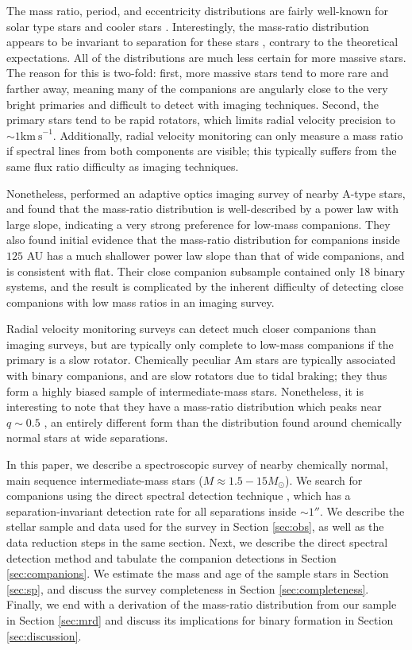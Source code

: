 \documentclass{emulateapj}
\begin{document}
The mass ratio, period, and eccentricity distributions are fairly well-known for solar type stars \citep{Duquennoy1991, Raghavan2010} and cooler stars \citep{Fischer1992, Delfosse2004}. Interestingly, the mass-ratio distribution appears to be invariant to separation for these stars \citep{Meyer2013}, contrary to the theoretical expectations. All of the distributions are much less certain for more massive stars. The reason for this is two-fold: first, more massive stars tend to more rare and farther away, meaning many of the companions are angularly close to the very bright primaries and difficult to detect with imaging techniques. Second, the primary stars tend to be rapid rotators, which limits radial velocity precision to $\sim 1 \mathrm{km\ s}^{-1}$. Additionally, radial velocity monitoring can only measure a mass ratio if spectral lines from both components are visible; this typically suffers from the same flux ratio difficulty as imaging techniques. 

Nonetheless, \citet{DeRosa2014} performed an adaptive optics imaging survey of nearby A-type stars, and found that the mass-ratio distribution is well-described by a power law with large slope, indicating a very strong preference for low-mass companions. They also found initial evidence that the mass-ratio distribution for companions inside $125$ AU has a much shallower power law slope than that of wide companions, and is consistent with flat. Their close companion subsample contained only 18 binary systems, and the result is complicated by the inherent difficulty of detecting close companions with low mass ratios in an imaging survey. 

Radial velocity monitoring surveys can detect much closer companions than imaging surveys, but are typically only complete to low-mass companions if the primary is a slow rotator. Chemically peculiar Am stars are typically associated with binary companions, and are slow rotators due to tidal braking; they thus form a highly biased sample of intermediate-mass stars. Nonetheless, it is interesting to note that they have a mass-ratio distribution which peaks near $q \sim 0.5$ \citep{Vuissoz2004}, an entirely different form than the distribution found around chemically normal stars at wide separations.

In this paper, we describe a spectroscopic survey of nearby chemically normal, main sequence intermediate-mass stars ($M \approx 1.5 - 15 M_{\odot}$). We search for companions using the direct spectral detection technique \citep{Gullikson2016}, which has a separation-invariant detection rate for all separations inside $\sim 1 ''$. We describe the stellar sample and data used for the survey in Section \ref{sec:obs}, as well as the data reduction steps in the same section. Next, we describe the direct spectral detection method and tabulate the companion detections in Section \ref{sec:companions}. We estimate the mass and age of the sample stars in Section \ref{sec:sp}, and discuss the survey completeness in Section \ref{sec:completeness}. Finally, we end with a derivation of the mass-ratio distribution from our sample in Section \ref{sec:mrd} and discuss its implications for binary formation in Section \ref{sec:discussion}.
 
\end{document}
